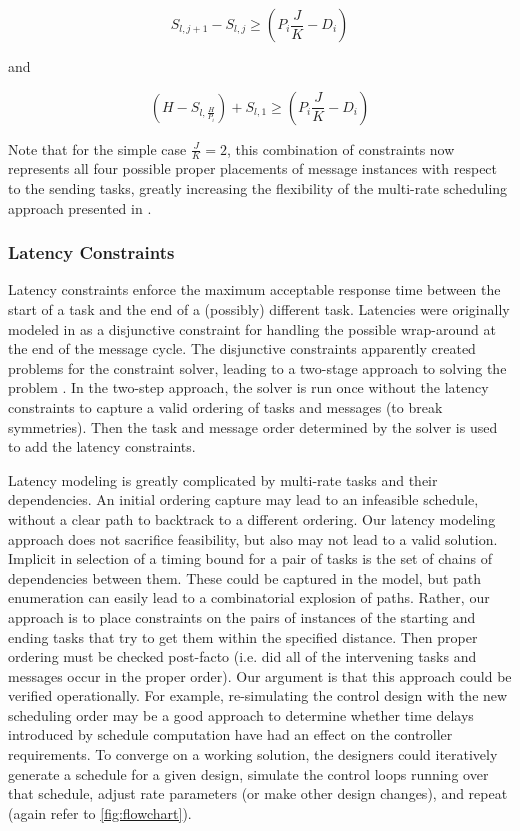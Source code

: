 \begin{equation}
S_{l,j + 1}  - S_{l,j}  \geqslant (P_i \frac{J}{K} - D_i )
\end{equation}

and

\begin{equation}
(H - S_{l,\frac{H}{{P_i }}} ) + S_{l,1}  \geqslant (P_i \frac{J}{K} - D_i )
\end{equation}

Note that for the simple case $\frac{J}{K} = 2$, this combination of constraints now represents all four possible proper placements of message instances with respect to the sending tasks, greatly increasing the flexibility of the multi-rate scheduling approach presented in \cite{sched:offline}.

\subsubsection{Latency Constraints}

Latency constraints enforce the maximum acceptable response time between the start of a task and the end of a (possibly) different task.  Latencies were originally modeled in \cite{sched:offline} as a disjunctive constraint for handling the possible wrap-around at the end of the message cycle.  The disjunctive constraints apparently created problems for the constraint solver, leading to a two-stage approach to solving the problem \cite{sched:offline}.  In the two-step approach, the solver is run once without the latency constraints to capture a valid ordering of tasks and messages (to break symmetries).  Then the task and message order determined by the solver is used to add the latency constraints.  

Latency modeling is greatly complicated by multi-rate tasks and their dependencies.  An initial ordering capture may lead to an infeasible schedule, without a clear path to backtrack to a different ordering.   Our latency modeling approach does not sacrifice feasibility, but also may not lead to a valid solution.  Implicit in selection of a timing bound for a pair of tasks is the set of chains of dependencies between them.  These could be captured in the model, but path enumeration can easily lead to a combinatorial explosion of paths.  Rather, our approach is to place constraints on the pairs of instances of the starting and ending tasks that try to get them within the specified distance.  Then proper ordering must be checked post-facto (i.e. did all of the intervening tasks and messages occur in the proper order).  Our argument is that this approach could be verified operationally.  For example, re-simulating the control design with the new scheduling order may be a good approach to determine whether time delays introduced by schedule computation have had an effect on the controller requirements.  To converge on a working solution, the designers could iteratively generate a schedule for a given design, simulate the control loops running over that schedule, adjust rate parameters (or make other design changes), and repeat (again refer to \ref{fig:flowchart}).

